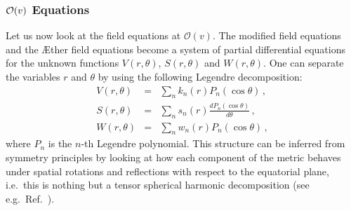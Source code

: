 \documentclass[prd,aps,twocolumn,nofootinbib,showpacs,superscriptaddress]{revtex4-1}
\newcommand\ba{\begin{eqnarray}}
\newcommand\ea{\end{eqnarray}}
\begin{document}
\subsubsection{${\cal{O}}(v)$ Equations}

Let us now look at the field equations at $\mathcal{O}(v)$. The
modified field equations and the \AE ther field equations become a system
of partial differential equations for the unknown functions
$V(r,\theta)$, $S(r,\theta)$ and $W(r,\theta)$. One can separate the
variables $r$ and $\theta$ by using the following Legendre
decomposition:
%
\ba
\label{LD:1}
V(r,\theta) &=& \sum_n k_n (r) P_n (\cos \theta)\,, \\ S(r,\theta) &=&
\sum_n s_n (r) \frac{d P_n (\cos \theta)}{d\theta}\,, \\ W(r,\theta)
&=& \sum_n w_n (r) P_n (\cos \theta)\,, 
\label{LD:3}
\ea
%
where $P_n$ is the $n$-th Legendre polynomial. This structure can be
inferred from symmetry principles by looking at how each component of
the metric behaves under spatial rotations and reflections with respect 
to the equatorial plane, i.e.~this is nothing but a tensor spherical harmonic 
decomposition (see e.g.~Ref.~\cite{Thorne:1980rm}).
\end{document}
